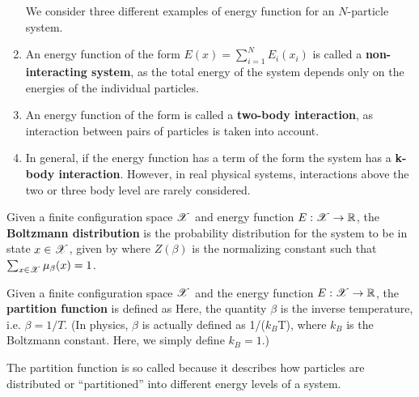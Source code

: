 \documentclass[letterpaper,english,10pt]{article}
\begin{document}
\begin{shaded*}
\begin{exmp}
\begin{enumerate} 
We consider three different examples of energy function for an $N$-particle system. 
\item 
An energy function of the form
$E(x)=\sum_{i=1}^{N} E_i(x_i)$
is called a \textbf{non-interacting system}, as the total energy of the system depends only on the energies of the individual particles. 
\item An energy function of the form  
is called a \textbf{two-body interaction}, as interaction between pairs of particles is taken into account. 
\item In general, if the energy function has a term of the form 
the system has a \textbf{k-body interaction}. 
However, in real physical systems, interactions above the two or three body level are rarely considered. 
\end{enumerate}
\end{exmp}
\end{shaded*}

\begin{defn} 
Given a finite configuration space $\mathscr{X}$ and energy function $E: \mathscr{X} \to \mathbb{R}$, 
the \textbf{Boltzmann distribution} is the probability distribution for the system to be in state $x \in \mathscr{X}$, 
given by
where $Z(\beta)$ is the normalizing constant such that $\sum_{x \in \mathscr{X}} \mu_{\beta}(x)=1$.
\end{defn}
\begin{defn}
Given a finite configuration space $\mathscr{X}$ and the energy function $E : \mathscr{X} \to \mathbb{R}$, 
the \textbf{partition function} is defined as
Here, the quantity $\beta$ is the inverse temperature, i.e. $\beta=1/T$. 
(In physics, $\beta$ is actually defined as 1/($k_B$T), where $k_B$ is the Boltzmann constant. Here, we simply define $k_B=1$.)
\end{defn}
The partition function is so called because it describes how particles are distributed or ``partitioned'' into different energy levels of a system.
\end{document}
